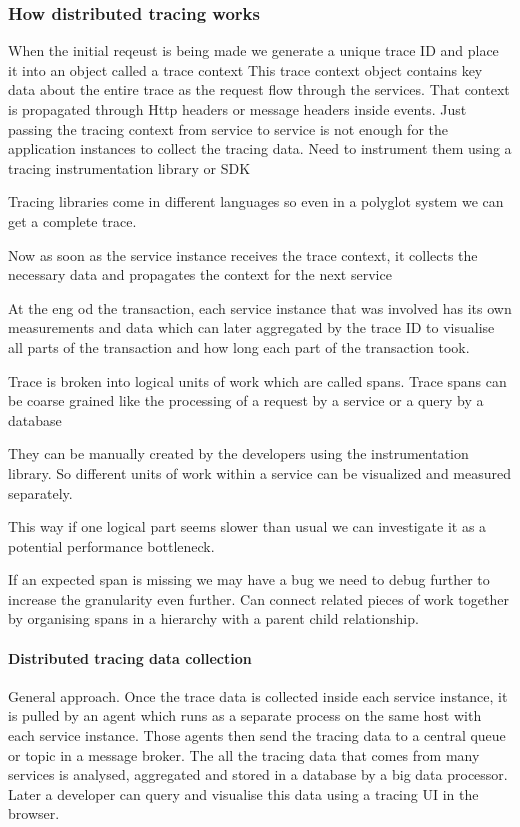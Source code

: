 \subsubsection{How distributed tracing works}
When the initial reqeust is being made we generate a unique trace ID and place it into an object called a trace context
This trace context object contains key data about the entire trace as the request flow through the services.
That context is propagated through Http headers or message headers inside events.
Just passing the tracing context from service to service is not enough for the application instances to collect the tracing data.
Need to instrument them using a tracing instrumentation library or SDK

Tracing libraries come in different languages so even in a polyglot system we can get a complete trace.

Now as soon as the service instance receives the trace context, it collects the necessary data and propagates the context for the next service

At the eng od the transaction, each service instance that was involved has its own measurements and data which can later aggregated by the trace ID to visualise all parts of the transaction and how long each part of the transaction took.

Trace is broken into logical units of work which are called spans.
Trace spans can be coarse grained like the processing of a request by a service or a query by a database

They can be manually created by the developers using the instrumentation library.
So different units of work within a service can be visualized and measured separately.

This way if one logical part seems slower than usual we can investigate it as a potential performance bottleneck.

If an expected span is missing we may have a bug we need to debug further to increase the granularity even further.
Can connect related pieces of work together by organising spans in a hierarchy with a parent child relationship.

\paragraph{Distributed tracing data collection}
General approach.
Once the trace data is collected inside each service instance, it is pulled by an agent which runs as a separate process on the same host with each service instance.
Those agents then send the tracing data to a central queue or topic in a message broker.
The all the tracing data that comes from many services is analysed, aggregated and stored in a database by a big data processor.
Later a developer can query and visualise this data using a tracing UI in the browser.

